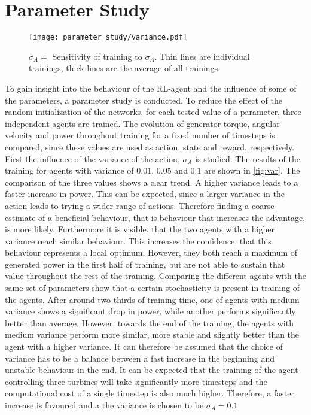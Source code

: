 \section{Parameter Study}
\begin{figure}[ht]
	\centering
	\texttt{[image: parameter\_study/variance.pdf]}
	\caption{$\sigma_A=$ Sensitivity of training to $\sigma_A$. Thin lines are individual trainings, thick lines are the average of all trainings.}
	\label{fig:var}
\end{figure}
To gain insight into the behaviour of the RL-agent and the influence of some of the parameters, a parameter study is conducted. To reduce the effect of the random initialization of the networks, for each tested value of a parameter, three independent agents are trained. The evolution of generator torque, angular velocity and power throughout training for a fixed number of timesteps is compared, since these values are used as action, state and reward, respectively. \\
First the influence of the variance of the action, $\sigma_A$ is studied. The results of the training for agents with variance of $0.01$, $0.05$ and $0.1$ are shown in \autoref{fig:var}. The comparison of the three values shows a clear trend. A higher variance leads to a faster increase in power. 
This can be expected, since a larger variance in the action leads to trying a wider range of actions. Therefore finding a coarse estimate of a beneficial behaviour, that is behaviour that increases the advantage, is more likely. Furthermore it is visible, that the two agents with a higher variance reach similar behaviour. This increases the confidence, that this behaviour represents a local optimum. However, they both reach a maximum of generated power in the first half of training, but are not able to sustain that value throughout the rest of the training. Comparing the different agents with the same set of parameters show that a certain stochasticity is present in training of the agents.  After around two thirds of training time, one of agents with medium variance shows a significant drop in power, while another performs significantly better than average. However, towards the end of the training, the agents with medium variance perform more similar, more stable and slightly better than the agent with a higher variance. It can therefore be assumed that the choice of variance has to be a balance between a fast increase in the beginning and unstable behaviour in the end. It can be expected that the training of the agent controlling three turbines will take significantly more timesteps and the computational cost of a single timestep is also much higher. Therefore, a faster increase is favoured and a the variance is chosen to be $\sigma_A = 0.1$. \\
